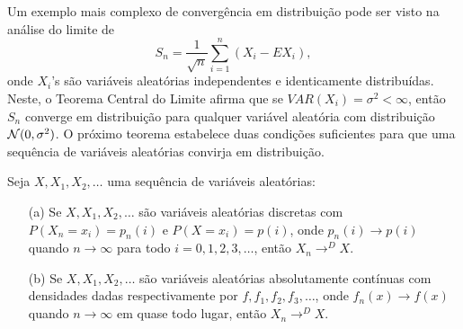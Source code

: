 %
%
\begin{frame}
%
%
%
Um exemplo mais complexo de convergência em distribuição pode ser
visto na análise do limite de
$$S_n=\frac{1}{\sqrt{n}}\sum_{i=1}^{n}(X_i-EX_i),$$
onde $X_i$'s são variáveis aleatórias independentes e identicamente
distribuídas. Neste, o Teorema Central do Limite afirma que se
$VAR(X_i)=\sigma^2<\infty$, então $S_n$ converge em distribuição
para qualquer variável aleatória com distribuição ${\cal N}(0,\sigma^2)$.
%
%
%
%
%
O próximo teorema estabelece duas condições suficientes para que uma sequência de variáveis aleatórias convirja em distribuição.
%
\begin{teo}
Seja $X,X_1,X_2,\ldots$ uma sequência de variáveis aleatórias:
\begin{enumerate}
\item[(a)] Se $X,X_1,X_2,\ldots$ são variáveis aleatórias discretas com $P(X_n=x_i)=p_n(i)$ e $P(X=x_i)=p(i)$, onde $p_n(i)\rightarrow p(i)$ quando $n\rightarrow\infty$ para todo $i=0,1,2,3,\ldots$, então $X_n\rightarrow^D X$.

\item[(b)] Se $X,X_1,X_2,\ldots$ são variáveis aleatórias absolutamente contínuas com densidades dadas respectivamente por $f,f_1,f_2,f_3,\ldots$, onde $f_n(x)\rightarrow f(x)$ quando $n\rightarrow\infty$ em quase todo lugar, então $X_n\rightarrow^D X$.
\end{enumerate}
\end{teo}
%
\end{frame}
%
%
